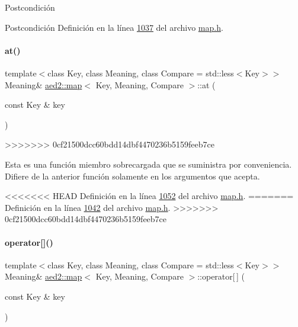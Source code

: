 \begin{DoxyPostcond}{\-Postcondición}
\begin{DoxyPostcond}{\-Postcondición}
Definición en la línea \hyperlink{map_8h_source_l01037}{1037} del archivo \hyperlink{map_8h_source}{map.\+h}.

\mbox{\label{classaed2_1_1map_a6b21c09f59a83b6ee45432dcfa61f4a1_a6b21c09f59a83b6ee45432dcfa61f4a1}} 
\paragraph{\texorpdfstring{at()}{at()}\hspace{0.1cm}{\footnotesize\ttfamily [2/2]}}
{\footnotesize\ttfamily template$<$class Key, class Meaning, class Compare = std\+::less$<$\+Key$>$$>$ \\
Meaning\& \hyperlink{classaed2_1_1map}{aed2\+::map}$<$ Key, Meaning, Compare $>$\+::at (\begin{DoxyParamCaption}\item[{const Key \&}]{key }\end{DoxyParamCaption})\hspace{0.3cm}{\ttfamily [inline]}}
>>>>>>> 0cf21500dcc60bdd14dbf4470236b5159feeb7ce

Esta es una función miembro sobrecargada que se suministra por conveniencia. Difiere de la anterior función solamente en los argumentos que acepta. 

<<<<<<< HEAD
\-Definición en la línea \hyperlink{map_8h_source_l01052}{1052} del archivo \hyperlink{map_8h_source}{map.\-h}.
=======
Definición en la línea \hyperlink{map_8h_source_l01042}{1042} del archivo \hyperlink{map_8h_source}{map.\+h}.
>>>>>>> 0cf21500dcc60bdd14dbf4470236b5159feeb7ce

\mbox{\label{classaed2_1_1map_a96f23896164ab47bee48c26b803f9801_a96f23896164ab47bee48c26b803f9801}} 
\paragraph{\texorpdfstring{operator[]()}{operator[]()}}
{\footnotesize\ttfamily template$<$class Key, class Meaning, class Compare = std\+::less$<$\+Key$>$$>$ \\
Meaning\& \hyperlink{classaed2_1_1map}{aed2\+::map}$<$ Key, Meaning, Compare $>$\+::operator\mbox{[}$\,$\mbox{]} (\begin{DoxyParamCaption}\item[{const Key \&}]{key }\end{DoxyParamCaption})\hspace{0.3cm}{\ttfamily [inline]}}




\end{DoxyPostcond}
\end{DoxyPostcond}
